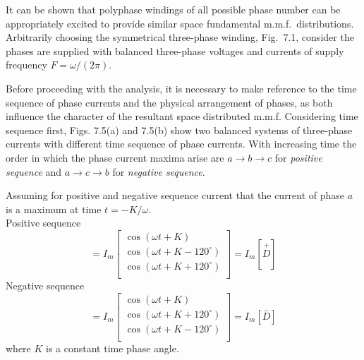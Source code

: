 \documentclass[a4paper,numbers=noenddot,12pt]{scrbook}
\begin{document}
        It can be shown that polyphase windings of all possible phase number can be appropriately excited to provide similar space fundamental m.m.f.\ distributions. Arbitrarily choosing the symmetrical three-phase winding, Fig.\ 7.1, consider the phases are supplied with balanced three-phase voltages and currents of supply frequency $F = \omega /(2\pi)$.

        Before proceeding with the analysis, it is necessary to make reference to the time sequence of phase currents and the physical arrangement of phases, as both influence the character of the resultant space distributed m.m.f. Considering time sequence first, Figs. 7.5(a) and 7.5(b) show two balanced systems of three-phase currents with different time sequence of phase currents. With increasing time the order in which the phase current maxima arise are $a \rightarrow b \rightarrow c$ for \textit{positive
        sequence}  and $a \rightarrow c \rightarrow b$ for \textit{negative sequence}.

        Assuming for positive and negative sequence current that the current of phase $a$ is a maximum at time $t = -K/\omega$.\\
        Positive sequence
        \begin{equation}
            [i_{abc}] = I_m
            \begin{bmatrix}
                \cos (\omega t + K)\\
                \cos (\omega t + K - 120^{\circ}) \\
                \cos (\omega t + K + 120^{\circ}) \\
            \end{bmatrix}
            =
            I_m[\overset{+}{D}]
            \label{eq:Eq7.76}
        \end{equation}
        Negative sequence
        \begin{equation}
            [i_{abc}] = I_m
            \begin{bmatrix}
                \cos (\omega t + K)\\
                \cos (\omega t + K + 120^{\circ}) \\
                \cos (\omega t + K - 120^{\circ}) \\
            \end{bmatrix}
            =
            I_m[\overset{-}{D}]
            \label{eq:Eq7.77}
        \end{equation}
        where $K$ is a constant time phase angle.
\end{document}
